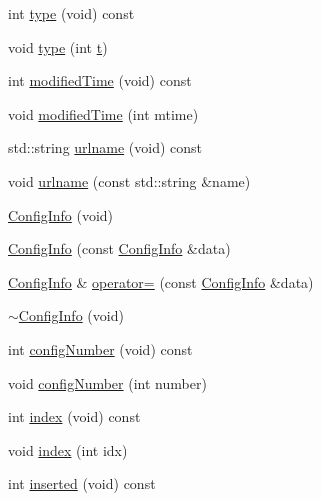 \begin{DoxyCompactItemize}
int \mbox{\hyperlink{classFILEDB_1_1ConfigInfo_a8053fc6dd889fb1e7c888359412fc0c7}{type}} (void) const
\item 
void \mbox{\hyperlink{classFILEDB_1_1ConfigInfo_a8d65b3b00e90f7daa4ab65fae36ed024}{type}} (int \mbox{\hyperlink{adat__devel_2lib_2hadron_2hadron__timeslice_8cc_ac310d9181e916ba43604099aee272c71}{t}})
\item 
int \mbox{\hyperlink{classFILEDB_1_1ConfigInfo_a03212f15d26edbae21ea53bbce2b1793}{modified\+Time}} (void) const
\item 
void \mbox{\hyperlink{classFILEDB_1_1ConfigInfo_a5c250fc2d94faafa05f18d8126ccf0cb}{modified\+Time}} (int mtime)
\item 
std\+::string \mbox{\hyperlink{classFILEDB_1_1ConfigInfo_aae1f3e5b2bd95afcd655b4df4548dc1f}{urlname}} (void) const
\item 
void \mbox{\hyperlink{classFILEDB_1_1ConfigInfo_a49750ae80347780d48415cb7aac9a068}{urlname}} (const std\+::string \&name)
\item 
\mbox{\hyperlink{classFILEDB_1_1ConfigInfo_a5aa818d39aeb907f27e064cab48c3522}{Config\+Info}} (void)
\item 
\mbox{\hyperlink{classFILEDB_1_1ConfigInfo_aa36d3fc640cd713ac561f89483c1b5f9}{Config\+Info}} (const \mbox{\hyperlink{classFILEDB_1_1ConfigInfo}{Config\+Info}} \&data)
\item 
\mbox{\hyperlink{classFILEDB_1_1ConfigInfo}{Config\+Info}} \& \mbox{\hyperlink{classFILEDB_1_1ConfigInfo_addda23bfc94267dee10eb00355316514}{operator=}} (const \mbox{\hyperlink{classFILEDB_1_1ConfigInfo}{Config\+Info}} \&data)
\item 
\mbox{\hyperlink{classFILEDB_1_1ConfigInfo_a26e3e1b90a453aac1419e42e7b13ce05}{$\sim$\+Config\+Info}} (void)
\item 
int \mbox{\hyperlink{classFILEDB_1_1ConfigInfo_ae4526dad4c6de972b1eb25ee8cd11c67}{config\+Number}} (void) const
\item 
void \mbox{\hyperlink{classFILEDB_1_1ConfigInfo_a226c79a0ee78d03894cfb6b7ed207992}{config\+Number}} (int number)
\item 
int \mbox{\hyperlink{classFILEDB_1_1ConfigInfo_a1ea886d3469211d480bf2c26d474c365}{index}} (void) const
\item 
void \mbox{\hyperlink{classFILEDB_1_1ConfigInfo_a150cd1f4438ac651aef387d251506dc7}{index}} (int idx)
\item 
int \mbox{\hyperlink{classFILEDB_1_1ConfigInfo_a45cc2aa85de0ccd89c06989bb9cff843}{inserted}} (void) const
\item 

\end{DoxyCompactItemize}
